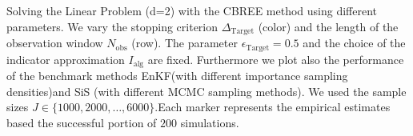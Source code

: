 Solving the Linear Problem (d=2) with the CBREE method using  different parameters. We vary the stopping criterion $\Delta_{\text{Target}}$ (color) and the length of the observation window $N_\text{obs}$ (row). The parameter $\epsilon_{\text{Target}} = 0.5$ and the choice of the indicator approximation $I_\text{alg}$ are fixed. Furthermore we plot also the performance of the benchmark methods EnKF(with different importance sampling densities)and SiS (with different MCMC sampling methods). We used the sample sizes $J \in \{1000, 2000, \ldots, 6000\}$.Each marker represents the empirical estimates based the successful portion of $200$ simulations.